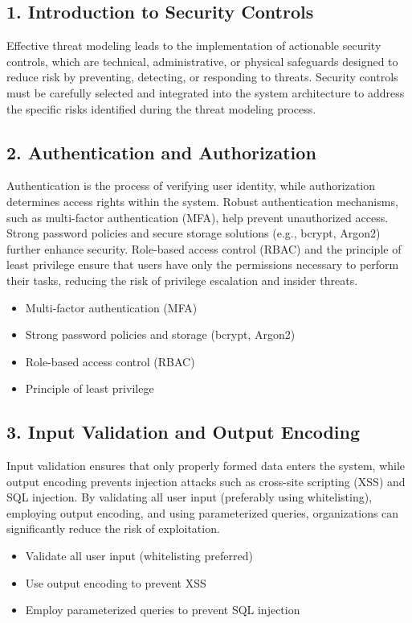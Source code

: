 

\subsection*{1. Introduction to Security Controls}
Effective threat modeling leads to the implementation of actionable security controls, which are technical, administrative, or physical safeguards designed to reduce risk by preventing, detecting, or responding to threats\cite{owasp,shostack2014}. Security controls must be carefully selected and integrated into the system architecture to address the specific risks identified during the threat modeling process.

\subsection*{2. Authentication and Authorization}
Authentication is the process of verifying user identity, while authorization determines access rights within the system\cite{owasp}. Robust authentication mechanisms, such as multi-factor authentication (MFA), help prevent unauthorized access. Strong password policies and secure storage solutions (e.g., bcrypt, Argon2) further enhance security. Role-based access control (RBAC) and the principle of least privilege ensure that users have only the permissions necessary to perform their tasks, reducing the risk of privilege escalation and insider threats.
\begin{itemize}
	\item Multi-factor authentication (MFA)
	\item Strong password policies and storage (bcrypt, Argon2)
	\item Role-based access control (RBAC)
	\item Principle of least privilege
\end{itemize}

\subsection*{3. Input Validation and Output Encoding}
Input validation ensures that only properly formed data enters the system, while output encoding prevents injection attacks such as cross-site scripting (XSS) and SQL injection\cite{owasp}. By validating all user input (preferably using whitelisting), employing output encoding, and using parameterized queries, organizations can significantly reduce the risk of exploitation.
\begin{itemize}
	\item Validate all user input (whitelisting preferred)
	\item Use output encoding to prevent XSS
	\item Employ parameterized queries to prevent SQL injection
\end{itemize}

